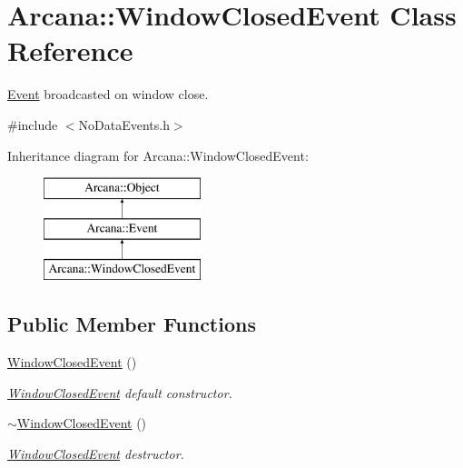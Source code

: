 \hypertarget{class_arcana_1_1_window_closed_event}{}\section{Arcana\+:\+:Window\+Closed\+Event Class Reference}
\label{class_arcana_1_1_window_closed_event}


\mbox{\hyperlink{class_arcana_1_1_event}{Event}} broadcasted on window close.  




{\ttfamily \#include $<$No\+Data\+Events.\+h$>$}

Inheritance diagram for Arcana\+:\+:Window\+Closed\+Event\+:\begin{figure}[H]
\begin{center}
\leavevmode
\includegraphics[height=3.000000cm]{class_arcana_1_1_window_closed_event}
\end{center}
\end{figure}
\subsection*{Public Member Functions}
\begin{DoxyCompactItemize}
\item 
\mbox{\label{class_arcana_1_1_window_closed_event_aa52319ea28c47ae5ec436666074be8f3}} 
\mbox{\hyperlink{class_arcana_1_1_window_closed_event_aa52319ea28c47ae5ec436666074be8f3}{Window\+Closed\+Event}} ()
\begin{DoxyCompactList}\small\item\em \mbox{\hyperlink{class_arcana_1_1_window_closed_event}{Window\+Closed\+Event}} default constructor. \end{DoxyCompactList}\item 
\mbox{\label{class_arcana_1_1_window_closed_event_a80ae09b50ce88ce3c7c9884edb220e86}} 
\mbox{\hyperlink{class_arcana_1_1_window_closed_event_a80ae09b50ce88ce3c7c9884edb220e86}{$\sim$\+Window\+Closed\+Event}} ()
\begin{DoxyCompactList}\small\item\em \mbox{\hyperlink{class_arcana_1_1_window_closed_event}{Window\+Closed\+Event}} destructor. \end{DoxyCompactList}\end{DoxyCompactItemize}


